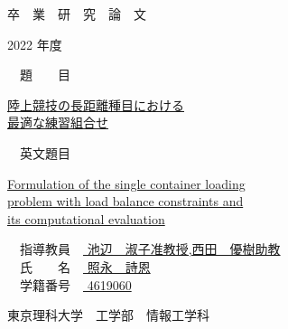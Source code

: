 \documentclass[12pt,fleqn]{jreport}
\begin{document}
\thispagestyle{empty}
\begin{center}
  {\Huge 卒　業　研　究　論　文}
\end{center}
\vspace{2cm}
\begin{center}
  {\huge 2022 年度}
\end{center}
\vspace{2cm}
\begin{flushleft}
  {\LARGE　題　　目　}
\end{flushleft}
\begin{center}
  {\LARGE \underline{陸上競技の長距離種目における}\\
    \vspace{0.2cm}
    \underline{最適な練習組合せ}}\\
\end{center}
\vspace{0.5cm}
\begin{flushleft}
  {\LARGE　英文題目　}
\end{flushleft}
\begin{center}
  {\LARGE \underline{Formulation of the single container loading }\\
    \vspace{0.2cm}
    \underline{ problem with load balance constraints and }\\
    \vspace{0.2cm}
    \underline {its computational evaluation}}\\
\end{center}
\vspace{3cm}
\begin{flushleft}
  {\Large　指導教員　\underline{ 池辺　淑子准教授,西田　優樹助教 }}\\
  \vspace{5mm}
  {\Large　氏　　名　\underline{ 照永　詩恩  }}\\
  \vspace{5mm}
  {\Large　学籍番号　\underline{ 4619060 }}
\end{flushleft}
\vspace{1.5cm}
\begin{flushright}
  {\Large 東京理科大学　工学部　情報工学科}\\
\end{flushright}
\newpage
\thispagestyle{empty}
\end{document}
